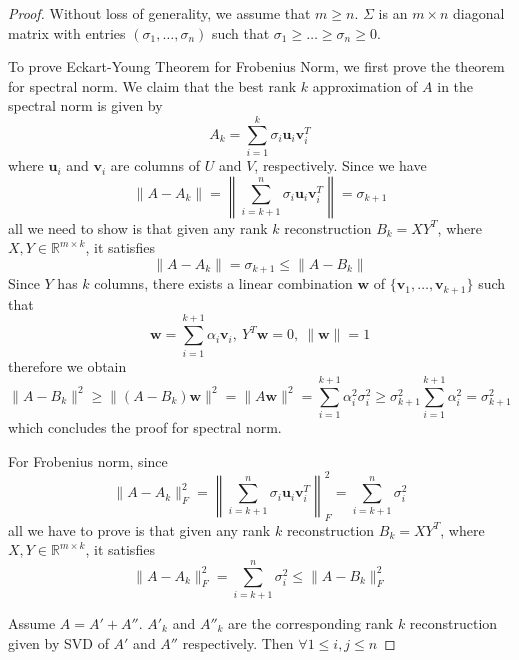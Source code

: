 \documentclass[../main.tex]{subfiles}
\begin{document}
\begin{proof}
	Without loss of generality, we assume that $m\geq n$. $\Sigma$ is an $m\times n$ diagonal matrix with entries $(\sigma_1,\dots,\sigma_n)$ such that $\sigma_1\geq\dots\geq \sigma_n\geq 0$.
	\par To prove Eckart-Young Theorem for Frobenius Norm, we first prove the theorem for spectral norm. We claim that the best rank $k$ approximation of $A$ in the spectral norm is given by
	\begin{equation*}
	A_k = \sum_{i=1}^{k}\sigma_i\bm{u}_i\bm{v}^T_i
	\end{equation*}
	where $\bm{u}_i$ and $\bm{v}_i$ are columns of $U$ and $V$, respectively. Since we have
	\begin{equation*}
	\|A-A_k\| = \left\|\sum_{i=k+1}^{n}\sigma_i\bm{u}_i\bm{v}^T_i\right\| = \sigma_{k+1}
	\end{equation*}
	all we need to show is that given any rank $k$ reconstruction $B_k=XY^T$, where $X,Y\in \mathbb{R}^{m\times k}$, it satisfies
	\begin{equation*}
	\|A-A_k\| =\sigma_{k+1}\leq \|A-B_k\|
	\end{equation*}
	Since $Y$ has $k$ columns, there exists a linear combination $\bm{w}$ of $\{\bm{v}_1,\dots,\bm{v}_{k+1}\}$ such that
	\begin{equation*}
	\bm{w} = \sum_{i=1}^{k+1}\alpha_i\bm{v}_i,\ Y^T\bm{w}=0,\ \|\bm{w}\|=1
	\end{equation*}
	therefore we obtain
	\begin{equation*}
	\|A-B_k\|^2\geq \|(A-B_k)\bm{w}\|^2 = \|A\bm{w}\|^2 = \sum_{i=1}^{k+1}\alpha_i^2\sigma_i^2\geq \sigma_{k+1}^2\sum_{i=1}^{k+1}\alpha_i^2 = \sigma_{k+1}^2
	\end{equation*}
	which concludes the proof for spectral norm.
	\par For Frobenius norm, since
	\begin{equation*}
	\|A-A_k\|_F^2= \left\|\sum_{i=k+1}^{n}\sigma_i\bm{u}_i\bm{v}^T_i\right\|_F^2 = \sum_{i=k+1}^{n}\sigma_i^2
	\end{equation*}
	all we have to prove is that given any rank $k$ reconstruction $B_k=XY^T$, where $X,Y\in \mathbb{R}^{m\times k}$, it satisfies
	\begin{equation*}
	\|A-A_k\|_F^2 =\sum_{i=k+1}^{n}\sigma_i^2\leq \|A-B_k\|_F^2
	\end{equation*}
	\par Assume $A=A'+A''$. $A'_k$ and $A''_k$ are the corresponding rank $k$ reconstruction given by SVD of $A'$ and $A''$ respectively. Then $\forall 1\leq i,j\leq n$

\end{proof}
\end{document}
